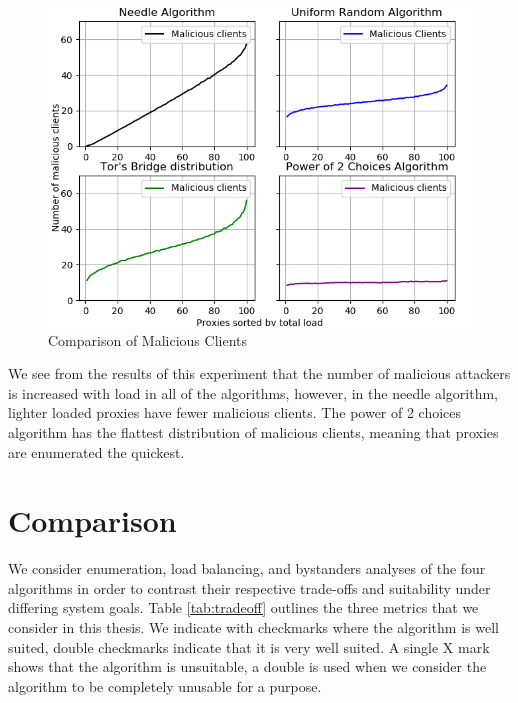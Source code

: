 \begin{figure}[h!]
\centering
     \includegraphics[width=1.0\textwidth]{fig/bystander_comparison_to_n_100.png}
    \caption{Comparison of Malicious Clients}

    \label{fig:bystandercompare}
\end{figure}

We see from the results of this experiment that the number of malicious attackers is increased with load in all of the algorithms, however, in the needle algorithm, lighter loaded proxies have fewer malicious clients. The power of 2 choices algorithm has the flattest distribution of malicious clients, meaning that proxies are enumerated the quickest.




\section{Comparison}

We consider enumeration, load balancing, and bystanders analyses of the four algorithms in order to contrast their respective trade-offs and suitability under differing system goals. Table \ref{tab:tradeoff} outlines the three metrics that we consider in this thesis. We indicate with checkmarks  where the algorithm is well suited, double checkmarks indicate that it is very well suited. A single X mark  shows that the algorithm is unsuitable, a double   is used when we consider the algorithm to be completely unusable for a purpose.


